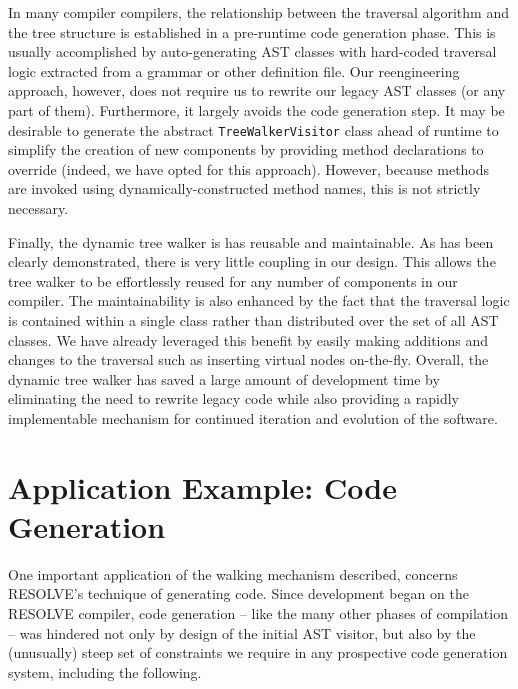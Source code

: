 \documentclass[times]{speauth}
\begin{document}
In many compiler compilers, the relationship between the traversal algorithm and the tree structure is established in a pre-runtime code generation phase. This is usually accomplished by auto-generating AST classes with hard-coded traversal logic extracted from a grammar or other definition file. Our reengineering approach, however, does not require us to rewrite our legacy AST classes (or any part of them). Furthermore, it largely avoids the code generation step. It may be desirable to generate the abstract \texttt{TreeWalkerVisitor} class ahead of runtime to simplify the creation of new components by providing method declarations to override (indeed, we have opted for this approach). However, because methods are invoked using dynamically-constructed method names, this is not strictly necessary.

Finally, the dynamic tree walker is has reusable and maintainable. As has been clearly demonstrated, there is very little coupling in our design. This allows the tree walker to be effortlessly reused for any number of components in our compiler. The maintainability is also enhanced by the fact that the traversal logic is contained within a single class rather than distributed over the set of all AST classes. We have already leveraged this benefit by easily making additions and changes to the traversal such as inserting virtual nodes on-the-fly. Overall, the dynamic tree walker has saved a large amount of development time by eliminating the need to rewrite legacy code while also providing a rapidly implementable mechanism for continued iteration and evolution of the software.


\section{Application Example: Code Generation}
\vspace{-2pt}

One important application of the walking mechanism described, concerns RESOLVE's technique of generating code. Since development began on the RESOLVE compiler, code generation -- like the many other phases of compilation -- was hindered not only by design of the initial  AST visitor, but also by the (unusually) steep set of constraints we require in any prospective code generation system, including the following.
\end{document}

